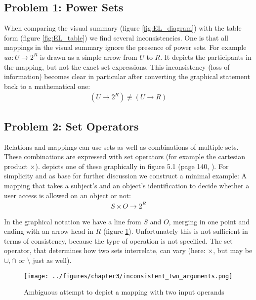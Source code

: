 \documentclass[twoside, openright, 12pt]{book}
\begin{document}
\subsection{Problem 1: Power Sets}
When comparing the visual summary (figure \ref{fig:EL_diagram}) with the table form (figure \ref{fig:EL_table}) we find several inconsistencies.
One is that all mappings in the visual summary ignore the presence of power sets.
For example $ua: U \rightarrow 2^R$ is drawn as a simple arrow from $U$ to $R$.
It depicts the participants in the mapping, but not the exact set expressions.
This inconsistency (loss of information) becomes clear in particular after converting the graphical statement back to a mathematical one:
\begin{align}
(U \rightarrow 2^R) \not\equiv (U \rightarrow R)
\end{align}



\subsection{Problem 2: Set Operators}
Relations and mappings can use sets as well as combinations of multiple sets.
These combinations are expressed with set operators (for example the cartesian product $\times$).
\cite{Amthor18} depicts one of these graphically in figure 5.1 (page 140, \citep{Amthor18}).
For simplicity and as base for further discussion we construct a minimal example: A mapping that takes a subject's and an object's identification to decide whether a user access is allowed on an object or not:
\begin{align}
S \times O \rightarrow 2^R
\end{align}

\noindent
In the graphical notation we have a line from $S$ and $O$, merging in one point and ending with an arrow head in $R$ (figure \ref{fig:inconsistent_two_arguments}).
Unfortunately this is not sufficient in terms of consistency, because the type of operation is not specified.
The set operator, that determines how two sets interrelate, can vary (here: $\times$, but may be $\cup, \cap$ or $\setminus$ just as well).

\begin{figure}[htb]
	\centering
	\texttt{[image: ../figures/chapter3/inconsistent\_two\_arguments.png]}
	\caption{Ambiguous attempt to depict a mapping with two input operands}
	\label{fig:inconsistent_two_arguments}
\end{figure}
\end{document}
